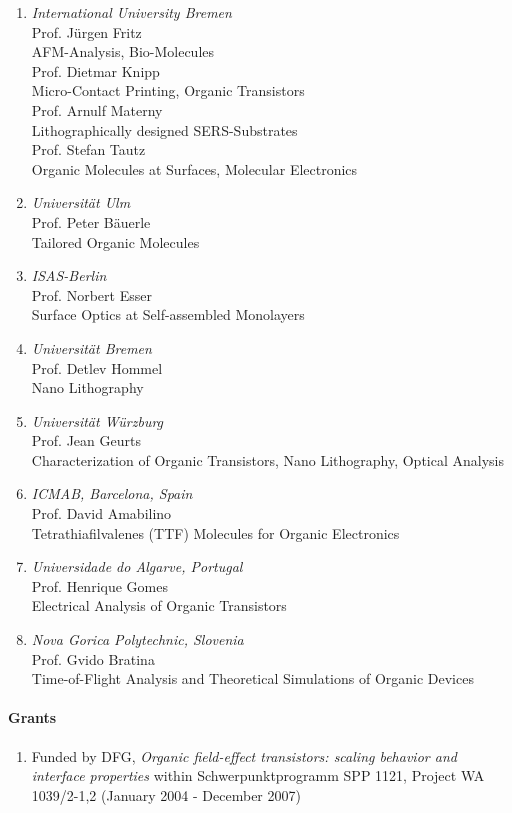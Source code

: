 \begin{enumerate}
\item {\sl International University Bremen}\\Prof. J{\"u}rgen
  Fritz\\AFM-Analysis, Bio-Molecules
\\Prof. Dietmar
  Knipp\\Micro-Contact Printing, Organic Transistors
\\Prof. Arnulf
  Materny\\Lithographically designed SERS-Substrates
\\Prof. Stefan
  Tautz\\Organic Molecules at Surfaces, Molecular Electronics
\item {\sl Universit{\"a}t Ulm}\\Prof. Peter B\"auerle\\Tailored
  Organic Molecules
\item {\sl ISAS-Berlin}\\Prof. Norbert Esser\\Surface Optics at
  Self-assembled Monolayers
\item {\sl Universit{\"a}t Bremen}\\Prof. Detlev Hommel\\Nano
  Lithography
\item {\sl Universit{\"a}t W{\"u}rzburg}\\Prof. Jean
  Geurts\\Characterization of Organic Transistors, Nano Lithography,
  Optical Analysis
\item {\sl ICMAB, Barcelona, Spain}\\Prof. David
  Amabilino\\Tetrathiafilvalenes (TTF) Molecules for Organic
  Electronics
\item {\sl Universidade do Algarve, Portugal}\\Prof. Henrique
  Gomes\\Electrical Analysis of Organic Transistors
\item {\sl Nova Gorica Polytechnic, Slovenia}\\Prof. Gvido
  Bratina\\Time-of-Flight Analysis and Theoretical Simulations of
  Organic Devices
\end{enumerate}

\paragraph{Grants}
\begin{enumerate}
\item Funded by DFG, \emph{Organic field-effect transistors: scaling behavior
and
  interface properties} within Schwerpunktprogramm SPP 1121, Project WA 1039/2-1,2
  (January 2004 - December 2007)
\end{enumerate}

